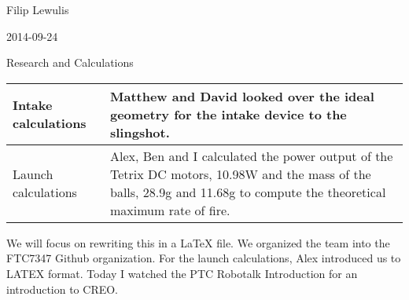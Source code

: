 Filip Lewulis

2014-09-24

Research and Calculations

\begin{tabular}{|p{5cm}|p{5cm}|}
  \hline
Intake calculations
  &
Matthew and David looked over the ideal geometry for the intake device to the slingshot.
\\
\hline
Launch calculations
  &
Alex, Ben and I calculated the power output of the Tetrix DC motors, 10.98W and the mass of the balls, 28.9g and 11.68g to compute the theoretical maximum rate of fire.
\\
  \hline
\end{tabular}
We will focus on rewriting this in a LaTeX file.
We organized the team into the FTC7347 Github organization. For the launch calculations,
Alex introduced us to LATEX format. Today I watched the PTC Robotalk Introduction for
an introduction to CREO.
